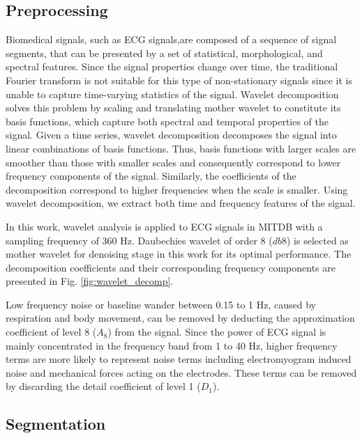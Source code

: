 \subsection{Preprocessing}
Biomedical signals, such as ECG signals,are composed of a sequence of signal segments, that can be presented by a set of statistical, morphological, and spectral features. Since the signal properties change over time, the traditional Fourier transform is not suitable for this type of non-stationary signals since it is unable to capture time-varying statistics of the signal. Wavelet decomposition solves this problem by scaling and translating mother wavelet to constitute its basis functions, which capture both spectral and temporal properties of the signal. Given a time series, wavelet decomposition decomposes the signal into linear combinations of basis functions. Thus, basis functions with larger scales are smoother than those with smaller scales and consequently correspond to lower frequency components of the signal. Similarly, the coefficients of the decomposition correspond to higher frequencies when the scale is smaller. Using wavelet decomposition, we extract both time and frequency features of the signal.


In this work, wavelet analysis is applied to ECG signals in MITDB with a sampling frequency of 360 Hz. Daubechies wavelet of order 8 ($db8$) is selected as mother wavelet for denoising stage in this work for its optimal performance\cite{denoise}. The decomposition coefficients and their corresponding frequency components are presented in Fig. \ref{fig:wavelet_decomp}. %

Low frequency noise or baseline wander between 0.15 to 1 Hz, caused by respiration and body movement, can be removed by deducting the approximation coefficient of level 8 ($A_8$) from the signal. Since the power of ECG signal is mainly concentrated in the frequency band from 1 to 40 Hz, higher frequency terms are more likely to represent noise terms including electromyogram induced noise and mechanical forces acting on the electrodes. These terms can be removed by discarding the detail coefficient of level 1 ($D_1$). 

\subsection{Segmentation}

